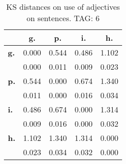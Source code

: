 \begin{table}[h!]
\begin{center}
\begin{tabular}{| l || c | c | c | c |}\hline
 & {\bf g.} & {\bf p.} & {\bf i.} & {\bf h.} \\\hline\hline
{\bf g.} & 0.000 & 0.544 & 0.486 & 1.102 \\
{\bf } & 0.000 & 0.011 & 0.009 & 0.023 \\\hline
{\bf p.} & 0.544 & 0.000 & 0.674 & 1.340 \\
{\bf } & 0.011 & 0.000 & 0.016 & 0.034 \\\hline
{\bf i.} & 0.486 & 0.674 & 0.000 & 1.314 \\
{\bf } & 0.009 & 0.016 & 0.000 & 0.032 \\\hline
{\bf h.} & 1.102 & 1.340 & 1.314 & 0.000 \\
{\bf } & 0.023 & 0.034 & 0.032 & 0.000 \\\hline
\end{tabular}
\caption{KS distances on use of adjectives on sentences. TAG: 6}
\end{center}
\end{table}